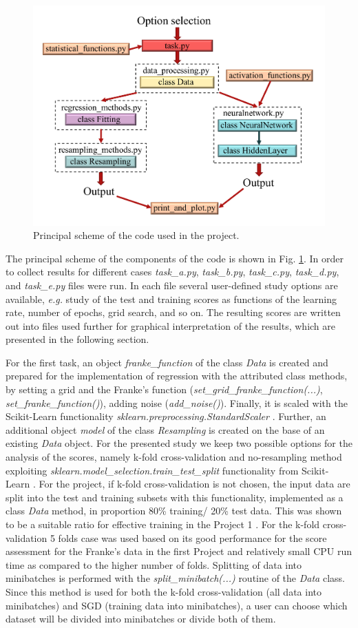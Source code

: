 \documentclass{emulateapj}
\begin{document}
\begin{figure}[!htb]
    \centering
    \includegraphics[width=.49\textwidth]{Figures/code.pdf}
    \caption{Principal scheme of the code used in the project.}
    \label{fig:code}
\end{figure}

The principal scheme of the components of the code is shown in Fig. \ref{fig:code}. In order to collect results for different cases \textit{task\_a.py}, \textit{task\_b.py}, \textit{task\_c.py}, \textit{task\_d.py}, and \textit{task\_e.py} files were run. In each file several user-defined study options are available, \textit{e.g.} study of the test and training scores as functions of the learning rate, number of epochs, grid search, and so on. The resulting scores are written out into files used further for graphical interpretation of the results, which are presented in the following section.


For the first task, an object \textit{franke\_function} of the class \textit{Data} is created and prepared for the implementation of regression with the attributed class methods,  by setting a grid and the Franke's function (\textit{set\_grid\_franke\_function(...)}, \textit{set\_franke\_function()}), adding noise (\textit{add\_noise()}). Finally, it is scaled with the Scikit-Learn functionality \textit{sklearn.preprocessing.StandardScaler} \cite{skl}. Further, an additional object \textit{model} of the class \textit{Resampling} is created on the base of an existing \textit{Data} object. For the presented study we keep two possible options for the analysis of the scores, namely k-fold cross-validation and no-resampling method exploiting \textit{sklearn.model\_selection.train\_test\_split} functionality from Scikit-Learn \cite{skl}. For the project, if k-fold cross-validation is not chosen, the input data are split into the test and training subsets with this functionality, implemented as a class \textit{Data} method, in proportion  80\% training/ 20\% test data. This was shown to be a suitable ratio for effective training in the Project 1 \cite{proj1}. For the k-fold cross-validation 5 folds case was used based on its good performance for the score assessment for the Franke's data in the first Project \cite{proj1,proj1_2} and relatively small CPU run time as compared to the higher number of folds. Splitting of data into minibatches is performed with the \textit{split\_minibatch(...)} routine of the \textit{Data} class. Since this method is used for both the k-fold cross-validation (all data into minibatches) and SGD (training data into minibatches), a user can choose which dataset will be divided into minibatches or divide both of them. 
\end{document}
